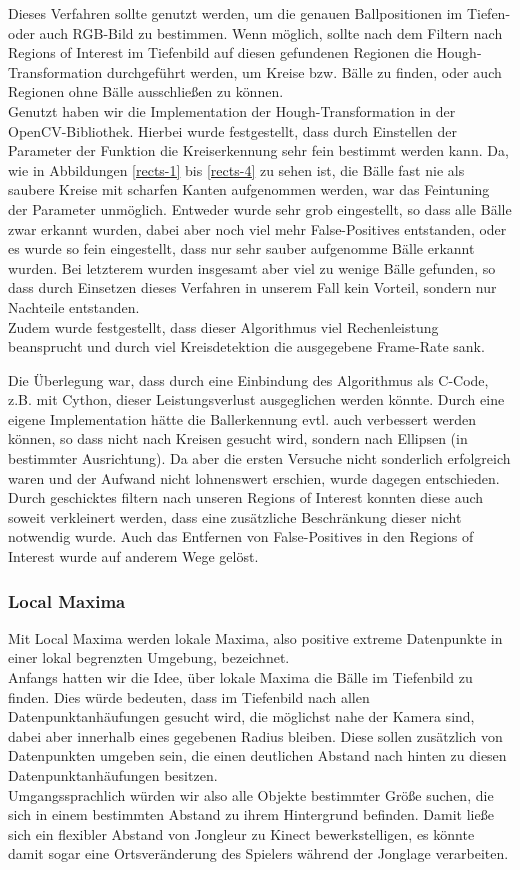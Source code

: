 \documentclass[12pt,a4paper,ngerman]{scrartcl}
\begin{document}
Dieses Verfahren sollte genutzt werden, um die genauen Ballpositionen im Tiefen- oder auch RGB-Bild zu bestimmen. Wenn möglich, sollte nach dem Filtern nach Regions of Interest im Tiefenbild auf diesen gefundenen Regionen die Hough-Transformation durchgeführt werden, um Kreise bzw. Bälle zu finden, oder auch Regionen ohne Bälle ausschließen zu können.\\
Genutzt haben wir die Implementation der Hough-Transformation in der OpenCV\cite{opencv}-Bibliothek. Hierbei wurde festgestellt, dass durch Einstellen der Parameter der Funktion die Kreiserkennung sehr fein bestimmt werden kann. Da, wie in Abbildungen \ref{rects-1} bis \ref{rects-4} zu sehen ist, die Bälle fast nie als saubere Kreise mit scharfen Kanten aufgenommen werden, war das Feintuning der Parameter unmöglich. Entweder wurde sehr grob eingestellt, so dass alle Bälle zwar erkannt wurden, dabei aber noch viel mehr False-Positives entstanden, oder es wurde so fein eingestellt, dass nur sehr sauber aufgenomme Bälle erkannt wurden. Bei letzterem wurden insgesamt aber viel zu wenige Bälle gefunden, so dass durch Einsetzen dieses Verfahren in unserem Fall kein Vorteil, sondern nur Nachteile entstanden.\\
Zudem wurde festgestellt, dass dieser Algorithmus viel Rechenleistung beansprucht und durch viel Kreisdetektion die ausgegebene Frame-Rate sank.

Die Überlegung war, dass durch eine Einbindung des Algorithmus als C-Code, z.B. mit Cython, dieser Leistungsverlust ausgeglichen werden könnte. Durch eine eigene Implementation hätte die Ballerkennung evtl. auch verbessert werden können, so dass nicht nach Kreisen gesucht wird, sondern nach Ellipsen (in bestimmter Ausrichtung). Da aber die ersten Versuche nicht sonderlich erfolgreich waren und der Aufwand nicht lohnenswert erschien, wurde dagegen entschieden. Durch geschicktes filtern nach unseren Regions of Interest konnten diese auch soweit verkleinert werden, dass eine zusätzliche Beschränkung dieser nicht notwendig wurde. Auch das Entfernen von False-Positives in den Regions of Interest wurde auf anderem Wege gelöst.

\subsubsection{Local Maxima}
Mit Local Maxima werden lokale Maxima, also positive extreme Datenpunkte in einer lokal begrenzten Umgebung, bezeichnet.\\
Anfangs hatten wir die Idee, über lokale Maxima die Bälle im Tiefenbild zu finden. Dies würde bedeuten, dass im Tiefenbild nach allen Datenpunktanhäufungen gesucht wird, die möglichst nahe der Kamera sind, dabei aber innerhalb eines gegebenen Radius bleiben. Diese sollen zusätzlich von Datenpunkten umgeben sein, die einen deutlichen Abstand nach hinten zu diesen Datenpunktanhäufungen besitzen.\\
Umgangssprachlich würden wir also alle Objekte bestimmter Größe suchen, die sich in einem bestimmten Abstand zu ihrem Hintergrund befinden. Damit ließe sich ein flexibler Abstand von Jongleur zu Kinect bewerkstelligen, es könnte damit sogar eine Ortsveränderung des Spielers während der Jonglage verarbeiten.
\end{document}
